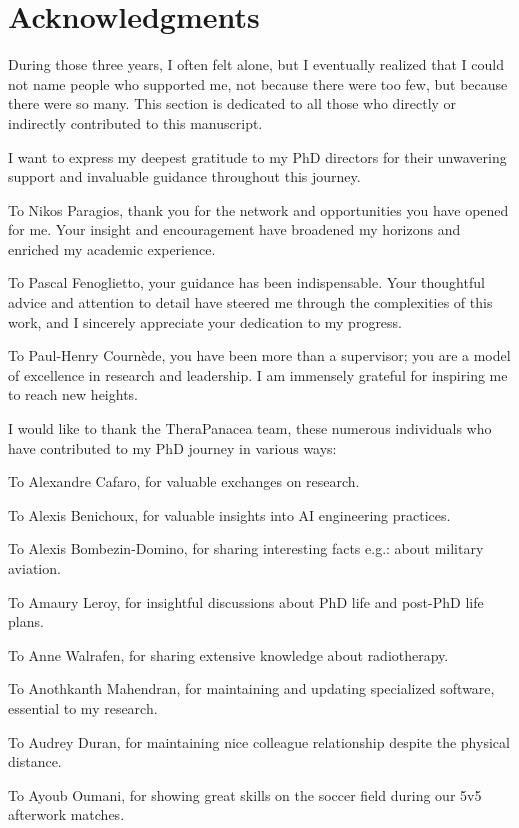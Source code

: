 \chapter*{Acknowledgments}
During those three years, I often felt alone, but I eventually realized that I could not name people who supported me, not because there were too few, but because there were so many.
This section is dedicated to all those who directly or indirectly contributed to this manuscript.



I want to express my deepest gratitude to my PhD directors for their unwavering support and invaluable guidance throughout this journey.

To Nikos Paragios, thank you for the network and opportunities you have opened for me.
Your insight and encouragement have broadened my horizons and enriched my academic experience.

To Pascal Fenoglietto, your guidance has been indispensable.
Your thoughtful advice and attention to detail have steered me through the complexities of this work, and I sincerely appreciate your dedication to my progress.

To Paul-Henry Cournède, you have been more than a supervisor; you are a model of excellence in research and leadership.
I am immensely grateful for inspiring me to reach new heights.



I would like to thank the TheraPanacea team, these numerous individuals who have contributed to my PhD journey in various ways:

To Alexandre Cafaro, for valuable exchanges on research.

To Alexis Benichoux, for valuable insights into AI engineering practices.

To Alexis Bombezin-Domino, for sharing interesting facts e.g.: about military aviation.

To Amaury Leroy, for insightful discussions about PhD life and post-PhD life plans.

To Anne Walrafen, for sharing extensive knowledge about radiotherapy.

To Anothkanth Mahendran, for maintaining and updating specialized software, essential to my research.

To Audrey Duran, for maintaining nice colleague relationship despite the physical distance.

To Ayoub Oumani, for showing great skills on the soccer field during our 5v5 afterwork matches.

